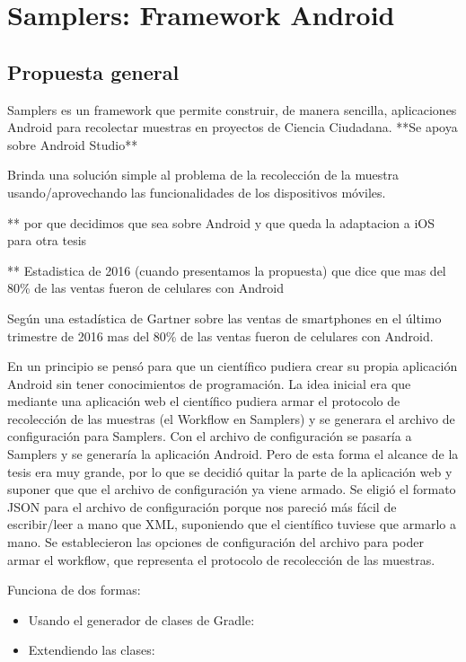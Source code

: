 \chapter{Samplers: Framework Android}

\section{Propuesta general}
Samplers es un framework que permite construir, de manera sencilla, aplicaciones Android para recolectar muestras en proyectos de Ciencia Ciudadana.
**Se apoya sobre Android Studio**

Brinda una solución simple al problema de la recolección de la muestra usando/aprovechando las funcionalidades de los dispositivos móviles.

** por que decidimos que sea sobre Android y que queda la adaptacion a iOS para otra tesis

** Estadistica de 2016 (cuando presentamos la propuesta) que dice que mas del 80\% de las ventas fueron de celulares con Android

Según una estadística de Gartner sobre las ventas de smartphones en el último trimestre de 2016\cite{gartner} mas del 80\% de las ventas fueron de celulares con Android.



En un principio se pensó para que un científico pudiera crear su propia aplicación Android sin tener conocimientos de programación. La idea inicial era que mediante una aplicación web el científico pudiera armar el protocolo de recolección de las muestras (el Workflow en Samplers) y se generara el archivo de configuración para Samplers. Con el archivo de configuración se pasaría a Samplers y se generaría la aplicación Android. Pero de esta forma el alcance de la tesis era muy grande, por lo que se decidió quitar la parte de la aplicación web y suponer que que el archivo de configuración ya viene armado.
Se eligió el formato JSON para el archivo de configuración porque nos pareció más fácil de escribir/leer a mano que XML, suponiendo que el científico tuviese que armarlo a mano. Se establecieron las opciones de configuración del archivo para poder armar el workflow, que representa el protocolo de recolección de las muestras.






Funciona de dos formas:
\begin{itemize}
\item Usando el generador de clases de Gradle: 
\item Extendiendo las clases: 
\end{itemize}


